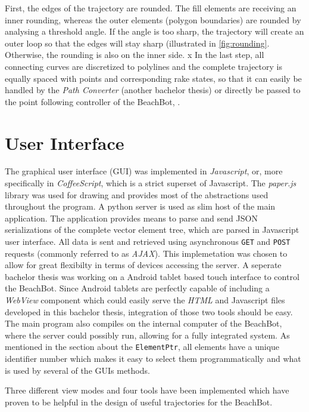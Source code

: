 First, the edges of the trajectory are rounded. The fill elements are receiving an inner rounding, whereas the outer elements (polygon boundaries) are rounded by analysing a threshold angle. If the angle is too sharp, the trajectory will create an outer loop so that the edges will stay sharp (illustrated in \autoref{fig:rounding}. Otherwise, the rounding is also on the inner side.
x
In the last step, all connecting curves are discretized to polylines and the complete trajectory is equally spaced with points and corresponding rake states, so that it can easily be handled by the \textit{Path Converter} (another bachelor thesis) or directly be passed to the point following controller of the BeachBot, .

\section{User Interface}

The graphical user interface (GUI) was implemented in \textit{Javascript}, or, more specifically in \textit{CoffeeScript}, which is a strict superset of Javascript. The \textit{paper.js} library was used for drawing and provides most of the abstractions used throughout the program. A python server is used as slim host of the main application. The application provides means to parse and send JSON serializations of the complete vector element tree, which are parsed in Javascript user interface. All data is sent and retrieved using asynchronous \texttt{GET} and \texttt{POST} requests (commonly referred to as \textit{AJAX}). This implemetation was chosen to allow for great flexibilty in terms of devices accessing the server. A seperate bachelor thesis was working on a Android tablet based touch interface to control the BeachBot. Since Android tablets are perfectly capable of including a \textit{WebView} component which could easily serve the \textit{HTML} and Javascript files developed in this bachelor thesis, integration of those two tools should be easy. The main program also compiles on the internal computer of the BeachBot, where the server could possibly run, allowing for a fully integrated system. As mentioned in the section about the \texttt{ElementPtr}, all elements have a unique identifier number which makes it easy to select them programmatically and what is used by several of the GUIs methods.

Three different view modes and four tools have been implemented which have proven to be helpful in the design of useful trajectories for the BeachBot.

